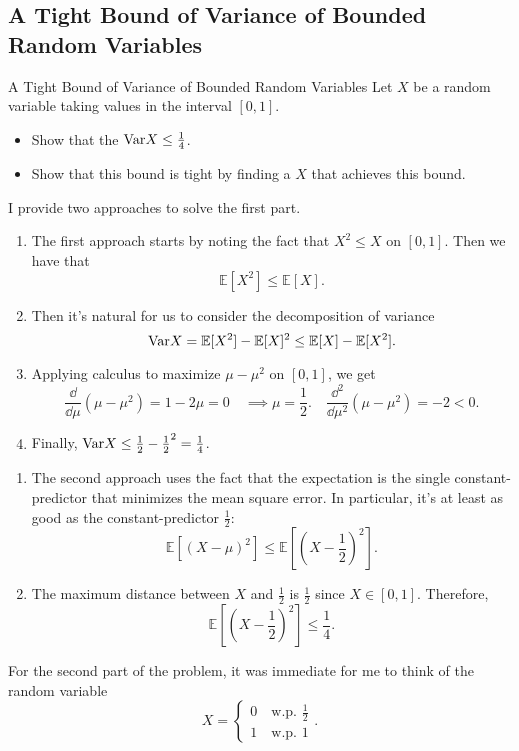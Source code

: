 \documentclass[../main]{subfiles}
\begin{document}
\subsection{A Tight Bound of Variance of Bounded Random Variables}
\begin{bbox}{A Tight Bound of Variance of Bounded Random Variables}
Let $X$ be a random variable taking values in the interval $[0,1]$. 
    \begin{itemize}
    \item Show that the $\text{Var} X \leq \frac{1}{4}$.
    \item Show that this bound is tight by finding a $X$ that achieves this bound.
\end{itemize}
\end{bbox}
\begin{solution}
    I provide two approaches to solve the first part. 
    \begin{enumerate}
        \item The first approach starts by noting the fact that $X^2 \leq X$ on $[0,1]$. Then we have that 
        \[
        \mathbb E [X^2] \leq \mathbb E [X].
        \]
        \item Then it's natural for us to consider the decomposition of variance 
        \[
        \text{Var} X = \mathbb E [X^2] - \mathbb E[X]^2 \leq \mathbb E[X] - \mathbb E [X^2]. 
        \]
        \item Applying calculus to maximize $\mu - \mu^2$ on $[0,1]$, we get 
        \[
        \frac{\dd}{\dd \mu} (\mu - \mu^2) = 1-2\mu = 0 \quad \implies \mu = \frac{1}{2}. \quad \frac{\dd^2}{\dd\mu^2}(\mu-\mu^2) = -2 < 0.
        \]
        \item Finally, $\text{Var} X \leq \frac{1}{2} - \frac{1}{2}^2 = \frac{1}{4}$. 
    \end{enumerate}
    \begin{enumerate}
        \item The second approach uses the fact that the expectation is the single constant-predictor that minimizes the mean square error. In particular, it's at least as good as the constant-predictor $\frac{1}{2}$:
        \[
        \mathbb E \left[(X-\mu)^2\right] \leq \mathbb E\left[(X-\frac{1}{2})^2\right].
        \]
        \item The maximum distance between $X$ and $\frac{1}{2}$ is $\frac{1}{2}$ since $X\in [0,1]$. Therefore,
        \[
        \mathbb E\left[(X-\frac{1}{2})^2\right] \leq \frac{1}{4}.
        \]
    \end{enumerate}
    For the second part of the problem, it was immediate for me to think of the random variable 
    \[
    X = \begin{cases}
        0 \quad \text{w.p. $\frac{1}{2}$} \\
        1 \quad \text{w.p. $1$} 
    \end{cases}.
    \]
\end{solution}
\end{document}
